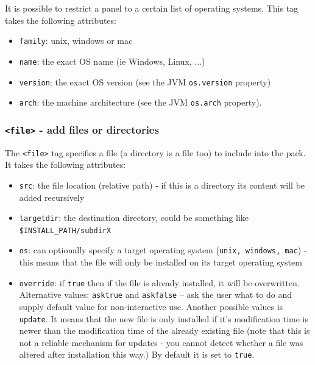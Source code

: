 It is possible to restrict a panel to a certain list of operating systems. This
tag takes the following attributes:
\begin{itemize}
\item \texttt{family}: unix, windows or mac
\item \texttt{name}: the exact OS name (ie Windows, Linux, ...)
\item \texttt{version}: the exact OS version (see the JVM \texttt{os.version} property)
\item \texttt{arch}: the machine architecture (see the JVM \texttt{os.arch} property).
\end{itemize}

\subsubsection{\label{tag:file}\texttt{<file>} - add files or directories}

The \texttt{<file>} tag specifies a file (a directory is a file too) to 
include into the pack. It takes the following attributes:

\begin{itemize}

  \item \texttt{src}: the file location (relative path) - if this is a
  directory its content will be added recursively

  \item \texttt{targetdir}: the destination directory, could be something like
  \texttt{\$INSTALL\_PATH/subdirX}

  \item \texttt{os}: can optionally specify a target operating system
  (\texttt{unix, windows, mac}) - this means that the file will only be
  installed on its target operating system

  \item \texttt{override}: if \texttt{true} then if the file is already
  installed, it will be overwritten. Alternative values: \texttt{asktrue} and
  \texttt{askfalse} -- ask the user what to do and supply default value for
  non-interactive use. Another possible values is \texttt{update}. It means
  that the new file is only installed if it's modification time is newer than
  the modification time of the already existing file (note that this is not a
  reliable mechanism for updates - you cannot detect whether a file was
  altered after installation this way.) By default it is set to \texttt{true}.

\end{itemize}

